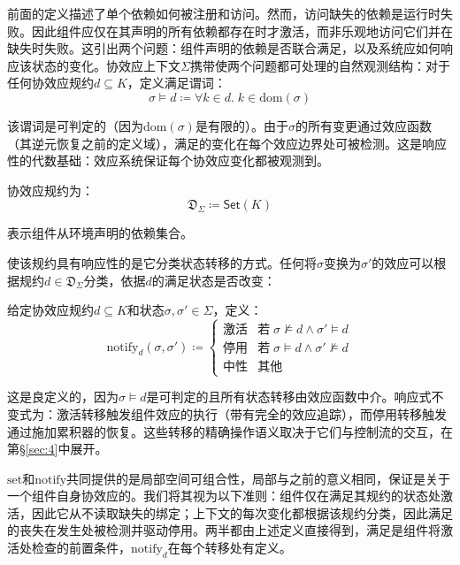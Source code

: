 前面的定义描述了单个依赖如何被注册和访问。然而，访问缺失的依赖是运行时失败。因此组件应仅在其声明的所有依赖都存在时才激活，而非乐观地访问它们并在缺失时失败。这引出两个问题：组件声明的依赖是否联合满足，以及系统应如何响应该状态的变化。协效应上下文$\Sigma$携带使两个问题都可处理的自然观测结构：对于任何协效应规约$d \subseteq K$，定义满足谓词：
\begin{equation}\label{eq:3.24}
\sigma \models d \coloneqq \forall k \in d.\; k \in \mathrm{dom}(\sigma)
\end{equation}

该谓词是可判定的（因为$\mathrm{dom}(\sigma)$是有限的）。由于$\sigma$的所有变更通过效应函数（其逆元恢复之前的定义域），满足的变化在每个效应边界处可被检测。这是响应性的代数基础：效应系统保证每个协效应变化都被观测到。

\begin{definition}\label{def:3.25}
协效应规约为：
\begin{equation}\label{eq:3.25}
\mathfrak{D}_\Sigma \coloneqq \mathsf{Set}(K)
\end{equation}
\end{definition}

表示组件从环境声明的依赖集合。

使该规约具有响应性的是它分类状态转移的方式。任何将$\sigma$变换为$\sigma'$的效应可以根据规约$d \in \mathfrak{D}_\Sigma$分类，依据$d$的满足状态是否改变：

\begin{definition}\label{def:3.26}
给定协效应规约$d \subseteq K$和状态$\sigma, \sigma' \in \Sigma$，定义：
\begin{equation}\label{eq:3.26}
\mathrm{notify}_d(\sigma, \sigma') \coloneqq
\begin{cases}
\mbox{激活} & \mbox{若}\;\sigma \not\models d \wedge \sigma' \models d \\
\mbox{停用} & \mbox{若}\;\sigma \models d \wedge \sigma' \not\models d \\
\mbox{中性} & \mbox{其他}
\end{cases}
\end{equation}
\end{definition}

这是良定义的，因为$\sigma \models d$是可判定的且所有状态转移由效应函数中介。响应式不变式为：激活转移触发组件效应的执行（带有完全的效应追踪），而停用转移触发通过施加累积器的恢复。这些转移的精确操作语义取决于它们与控制流的交互，在第\S\ref{sec:4}中展开。

$\mathrm{set}$和$\mathrm{notify}$共同提供的是局部空间可组合性，局部与之前的意义相同，保证是关于一个组件自身协效应的。我们将其视为以下准则：组件仅在满足其规约的状态处激活，因此它从不读取缺失的绑定；上下文的每次变化都根据该规约分类，因此满足的丧失在发生处被检测并驱动停用。两半都由上述定义直接得到，满足是组件将激活处检查的前置条件，$\mathrm{notify}_d$在每个转移处有定义。

